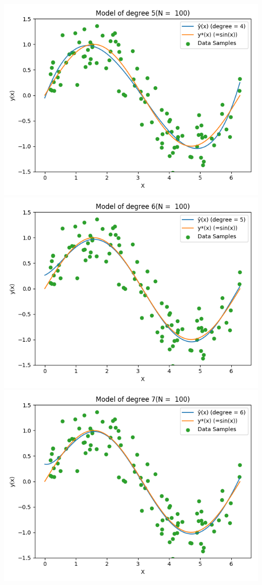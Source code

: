 \documentclass{article}
\begin{document}
\includegraphics[width=\linewidth]{5_100.png}
\includegraphics[width=\linewidth]{6_100.png}
\includegraphics[width=\linewidth]{7_100.png}
\end{document}
